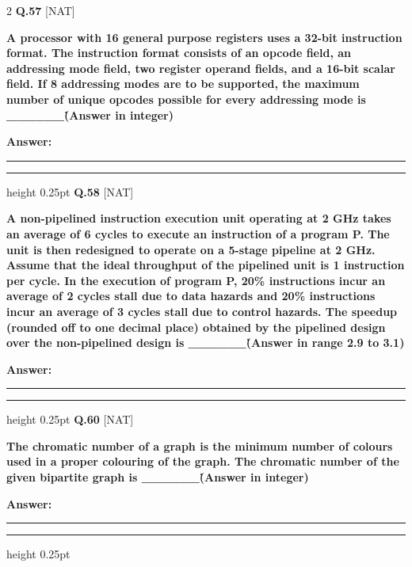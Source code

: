 \documentclass[a4paper,10pt,twoside]{article}
\begin{document}
\begin{multicols}{2}
\noindent\textbf{Q.57} \hfill {\footnotesize\textsf{[NAT]}}
\par\vspace{2pt}
{\bfseries A processor with 16 general purpose registers uses a 32-bit instruction format. The instruction format consists of an opcode field, an addressing mode field, two register operand fields, and a 16-bit scalar field. If 8 addressing modes are to be supported, the maximum number of unique opcodes possible for every addressing mode is \_\_\_\_\_\_\. (Answer in integer) \par}
\par\vspace{3pt}\noindent\textbf{Answer:} \rule{3.2cm}{0.4pt}
\par\vspace{6pt}\hrule height 0.25pt\vspace{6pt}
\noindent\textbf{Q.58} \hfill {\footnotesize\textsf{[NAT]}}
\par\vspace{2pt}
{\bfseries A non-pipelined instruction execution unit operating at 2 GHz takes an average of 6 cycles to execute an instruction of a program P. The unit is then redesigned to operate on a 5-stage pipeline at 2 GHz. Assume that the ideal throughput of the pipelined unit is 1 instruction per cycle. In the execution of program P, 20\% instructions incur an average of 2 cycles stall due to data hazards and 20\% instructions incur an average of 3 cycles stall due to control hazards. The speedup (rounded off to one decimal place) obtained by the pipelined design over the non-pipelined design is \_\_\_\_\_\_\. (Answer in range 2.9 to 3.1) \par}
\par\vspace{3pt}\noindent\textbf{Answer:} \rule{3.2cm}{0.4pt}
\par\vspace{6pt}\hrule height 0.25pt\vspace{6pt}
\noindent\textbf{Q.60} \hfill {\footnotesize\textsf{[NAT]}}
\par\vspace{2pt}
{\bfseries The chromatic number of a graph is the minimum number of colours used in a proper colouring of the graph. The chromatic number of the given bipartite graph is \_\_\_\_\_\_\. (Answer in integer) \par}
\par\vspace{3pt}\noindent\textbf{Answer:} \rule{3.2cm}{0.4pt}
\par\vspace{6pt}\hrule height 0.25pt\vspace{6pt}

\end{multicols}
\end{document}
